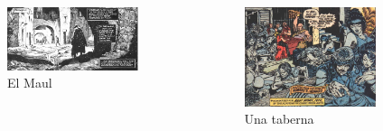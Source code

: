 \begin{frame}{}
\begin{columns}
    \begin{figure}[htb]
    \centering
        \includegraphics[width=0.9\textwidth]{img/res/01}
        \caption{El Maul}
    \end{figure}    
    \begin{figure}[htb]
    \centering
        \includegraphics[width=0.9\textwidth]{img/res/02}
        \caption{Una taberna}
    \end{figure}    
\end{columns}
\end{frame}

